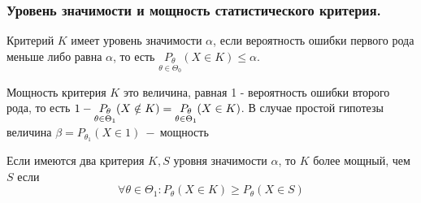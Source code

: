 \subsubsection{Уровень значимости и мощность статистического критерия.}
\begin{definition*}
Критерий $K$ имеет уровень значимости $\alpha$, если вероятность ошибки первого рода меньше либо равна $\alpha$, то есть $\underset{\theta\in\Theta_0}{P_\theta}(X\in K)\leq\alpha$.
\end{definition*}

\begin{definition*}
Мощность критерия $K$ это величина, равная 1 - вероятность ошибки второго рода, то есть $\\ 1-\underset{\theta\in\Theta_1}{P_\theta}(X\notin K)=\underset{\theta\in\Theta_1}{P_\theta}(X\in K)$. В случае простой гипотезы величина $\beta=P_{\theta_1}(X\in 1)~-~$мощность
\end{definition*} 

Если имеются два критерия $K,S$ уровня значимости $\alpha$, то $K$ более мощный, чем $S$ если $$\forall\theta\in\Theta_1\colon P_\theta(X\in K)\geq P_\theta(X\in S)$$
